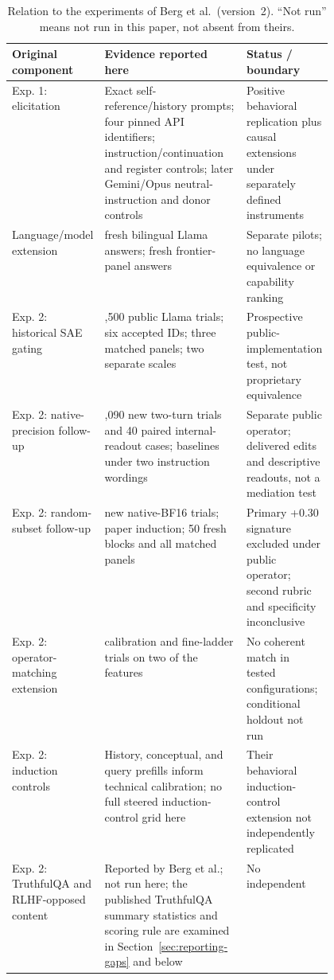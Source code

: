 \documentclass[11pt]{article}
\begin{document}
\begin{table}[!t]
\centering\small
\caption{Relation to the experiments of Berg et al.\ (version~2). ``Not run''
means not run in this paper, not absent from theirs.}
\label{tab:coverage}
\begin{tabularx}{\linewidth}{@{}>{\raggedright\arraybackslash}p{0.21\linewidth}>{\raggedright\arraybackslash}X>{\raggedright\arraybackslash}p{0.26\linewidth}@{}}
\toprule
Original component & Evidence reported here & Status / boundary\\
\midrule
Exp. 1: elicitation & Exact self-reference/history prompts; four pinned API
identifiers; instruction/continuation and register controls; later Gemini/Opus
neutral-instruction and donor controls & Positive behavioral replication plus
causal extensions under separately defined instruments\\
Language/model extension & \CELlamaAnswers{} fresh bilingual Llama answers;
\CEFrontierAnswers{} fresh frontier-panel answers & Separate pilots; no
language equivalence or capability ranking\\
Exp. 2: historical SAE gating & 1,500 public Llama trials; six accepted IDs; three
matched panels; two separate scales & Prospective public-implementation
test, not proprietary equivalence\\
Exp. 2: native-precision follow-up & 1,090 new two-turn trials and 40 paired
internal-readout cases; baselines under two instruction wordings & Separate public
operator; delivered edits and descriptive readouts, not a mediation test\\
Exp. 2: random-subset follow-up & 450 new native-BF16 trials; paper induction;
50 fresh blocks and all matched panels & Primary +0.30 signature excluded
under public operator; second rubric and specificity inconclusive\\
Exp. 2: operator-matching extension & \CEOperatorTrials{} calibration and
\CEFineTrials{} fine-ladder trials on two of the features & No coherent
match in tested configurations; conditional holdout not run\\
Exp. 2: induction controls & History, conceptual, and query prefills inform
technical calibration; no full steered induction-control grid here & Their
behavioral induction-control extension not independently replicated\\
Exp. 2: TruthfulQA and RLHF-opposed content & Reported by Berg et al.; not run
here; the published TruthfulQA summary statistics and scoring rule
are examined in Section~\ref{sec:reporting-gaps} and below & No independent

\end{tabularx}
\end{table}
\end{document}
